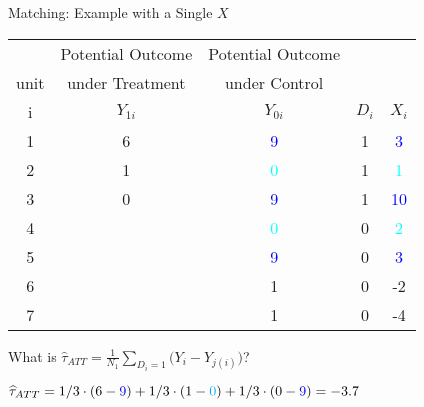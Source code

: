 \documentclass{beamer}
\numberwithin{equation}{section}
\begin{document}
\begin{frame}{Matching: Example with a Single $X$}

\begin{tabular}{c|c|c|c|c}
 &Potential Outcome & Potential Outcome &   & \\
unit &under Treatment  & under Control &   &  \\

\hline
   i  & $Y_{1i}$  & $Y_{0i}$ &    $D_i$ &  $X_i$ \\
\hline
         1 & \multicolumn{ 1}{c|}{6} & \multicolumn{ 1}{c|}{\textcolor{blue}{9}} &                    1 &          \textcolor{blue}{3} \\
         2 & \multicolumn{ 1}{c|}{1} & \multicolumn{ 1}{c|}{\textcolor{cyan}{0}} &                    1 &          \textcolor{cyan}{1} \\
         3 & \multicolumn{ 1}{c|}{0} & \multicolumn{ 1}{c|}{\textcolor{blue}{9}} &                    1 &          \textcolor{blue}{10} \\
\hline
         4 & \multicolumn{ 1}{c|}{} & \multicolumn{1}{c|}{\textcolor{cyan}{0}} &                    0 &          \textcolor{cyan}{2} \\
         5 & \multicolumn{ 1}{c|}{} & \multicolumn{1}{c|}{\textcolor{blue}{9}} &                    0 &          \textcolor{blue}{3} \\
         6 & \multicolumn{ 1}{c|}{} & \multicolumn{1}{c|}{1} &                    0 &          -2 \\
         7 & \multicolumn{ 1}{c|}{} & \multicolumn{1}{c|}{1} &                    0 &          -4 \\
         \hline
\end{tabular}

What is
$\widehat{\tau}_{ATT}= \frac{1}{N_1} \sum_{D_i=1} \big(Y_i - Y_{j(i)}\big)$?
\pause

$\widehat{\tau}_{ATT}=1/3\cdot(6-\textcolor{blue}{9})+1/3\cdot(1-\textcolor{cyan}{0})+1/3\cdot(0-\textcolor{blue}{9})=-3.7$

\end{frame}
\end{document}
